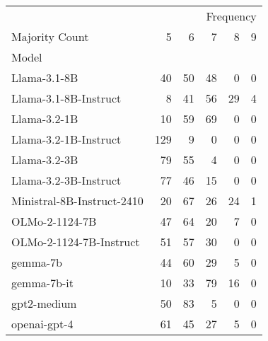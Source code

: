\begin{tabular}{lrrrrr}
\toprule
 & \multicolumn{5}{r}{Frequency} \\
Majority Count & 5 & 6 & 7 & 8 & 9 \\
Model &  &  &  &  &  \\
\midrule
Llama-3.1-8B & 40 & 50 & 48 & 0 & 0 \\
Llama-3.1-8B-Instruct & 8 & 41 & 56 & 29 & 4 \\
Llama-3.2-1B & 10 & 59 & 69 & 0 & 0 \\
Llama-3.2-1B-Instruct & 129 & 9 & 0 & 0 & 0 \\
Llama-3.2-3B & 79 & 55 & 4 & 0 & 0 \\
Llama-3.2-3B-Instruct & 77 & 46 & 15 & 0 & 0 \\
Ministral-8B-Instruct-2410 & 20 & 67 & 26 & 24 & 1 \\
OLMo-2-1124-7B & 47 & 64 & 20 & 7 & 0 \\
OLMo-2-1124-7B-Instruct & 51 & 57 & 30 & 0 & 0 \\
gemma-7b & 44 & 60 & 29 & 5 & 0 \\
gemma-7b-it & 10 & 33 & 79 & 16 & 0 \\
gpt2-medium & 50 & 83 & 5 & 0 & 0 \\
openai-gpt-4 & 61 & 45 & 27 & 5 & 0 \\
\bottomrule
\end{tabular}
